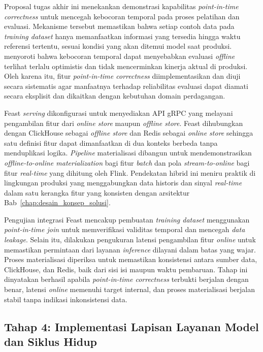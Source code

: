 Proposal tugas akhir ini menekankan demonstrasi kapabilitas \textit{point-in-time correctness} untuk mencegah kebocoran temporal pada proses pelatihan dan evaluasi. Mekanisme tersebut memastikan bahwa setiap contoh data pada \textit{training dataset} hanya memanfaatkan informasi yang tersedia hingga waktu referensi tertentu, sesuai kondisi yang akan ditemui model saat produksi. \textcite{polyzotis2018data} menyoroti bahwa kebocoran temporal dapat menyebabkan evaluasi \textit{offline} terlihat terlalu optimistis dan tidak mencerminkan kinerja aktual di produksi. Oleh karena itu, fitur \textit{point-in-time correctness} diimplementasikan dan diuji secara sistematis agar manfaatnya terhadap reliabilitas evaluasi dapat diamati secara eksplisit dan dikaitkan dengan kebutuhan domain perdagangan.

Feast \textit{serving} dikonfigurasi untuk menyediakan API gRPC yang melayani pengambilan fitur dari \textit{online store} maupun \textit{offline store}. Feast dihubungkan dengan ClickHouse sebagai \textit{offline store} dan Redis sebagai \textit{online store} sehingga satu definisi fitur dapat dimanfaatkan di dua konteks berbeda tanpa menduplikasi logika. \textit{Pipeline} materialisasi dibangun untuk mendemonstrasikan \textit{offline-to-online materialization} bagi fitur \textit{batch} dan pola \textit{stream-to-online} bagi fitur \textit{real-time} yang dihitung oleh Flink. Pendekatan hibrid ini meniru praktik di lingkungan produksi yang menggabungkan data historis dan sinyal \textit{real-time} dalam satu kerangka fitur yang konsisten dengan arsitektur Bab~\ref{chap:desain_konsep_solusi}.

Pengujian integrasi Feast mencakup pembuatan \textit{training dataset} menggunakan \textit{point-in-time join} untuk memverifikasi validitas temporal dan mencegah \textit{data leakage}. Selain itu, dilakukan pengukuran latensi pengambilan fitur \textit{online} untuk memastikan permintaan dari layanan \textit{inference} dilayani dalam batas yang wajar. Proses materialisasi diperiksa untuk memastikan konsistensi antara sumber data, ClickHouse, dan Redis, baik dari sisi isi maupun waktu pembaruan. Tahap ini dinyatakan berhasil apabila \textit{point-in-time correctness} terbukti berjalan dengan benar, latensi \textit{online} memenuhi target internal, dan proses materialisasi berjalan stabil tanpa indikasi inkonsistensi data.

\subsection{Tahap 4: Implementasi Lapisan Layanan Model dan Siklus Hidup}

